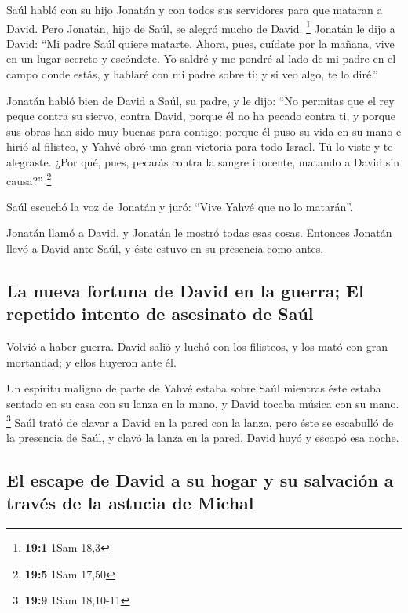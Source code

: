 \begin{paracol}{2}
 Saúl habló con su hijo Jonatán y con todos sus servidores
para que mataran a David. Pero Jonatán, hijo de Saúl, se alegró mucho de
David. \footnote{\textbf{19:1} 1Sam 18,3}  Jonatán le dijo
a David: ``Mi padre Saúl quiere matarte. Ahora, pues, cuídate por la
mañana, vive en un lugar secreto y escóndete.  Yo saldré y
me pondré al lado de mi padre en el campo donde estás, y hablaré con mi
padre sobre ti; y si veo algo, te lo diré.''

 Jonatán habló bien de David a Saúl, su padre, y le dijo:
``No permitas que el rey peque contra su siervo, contra David, porque él
no ha pecado contra ti, y porque sus obras han sido muy buenas para
contigo;  porque él puso su vida en su mano e hirió al
filisteo, y Yahvé obró una gran victoria para todo Israel. Tú lo viste y
te alegraste. ¿Por qué, pues, pecarás contra la sangre inocente, matando
a David sin causa?'' \footnote{\textbf{19:5} 1Sam 17,50}

 Saúl escuchó la voz de Jonatán y juró: ``Vive Yahvé que
no lo matarán''.

 Jonatán llamó a David, y Jonatán le mostró todas esas
cosas. Entonces Jonatán llevó a David ante Saúl, y éste estuvo en su
presencia como antes.

\hypertarget{la-nueva-fortuna-de-david-en-la-guerra-el-repetido-intento-de-asesinato-de-sauxfal}{%
\subsection{La nueva fortuna de David en la guerra; El repetido intento
de asesinato de
Saúl}\label{la-nueva-fortuna-de-david-en-la-guerra-el-repetido-intento-de-asesinato-de-sauxfal}}

 Volvió a haber guerra. David salió y luchó con los
filisteos, y los mató con gran mortandad; y ellos huyeron ante él.

 Un espíritu maligno de parte de Yahvé estaba sobre Saúl
mientras éste estaba sentado en su casa con su lanza en la mano, y David
tocaba música con su mano. \footnote{\textbf{19:9} 1Sam 18,10-11}
 Saúl trató de clavar a David en la pared con la lanza,
pero éste se escabulló de la presencia de Saúl, y clavó la lanza en la
pared. David huyó y escapó esa noche.

\hypertarget{el-escape-de-david-a-su-hogar-y-su-salvaciuxf3n-a-travuxe9s-de-la-astucia-de-michal}{%
\subsection{El escape de David a su hogar y su salvación a través de la
astucia de
Michal}\label{el-escape-de-david-a-su-hogar-y-su-salvaciuxf3n-a-travuxe9s-de-la-astucia-de-michal}}


\end{paracol}
